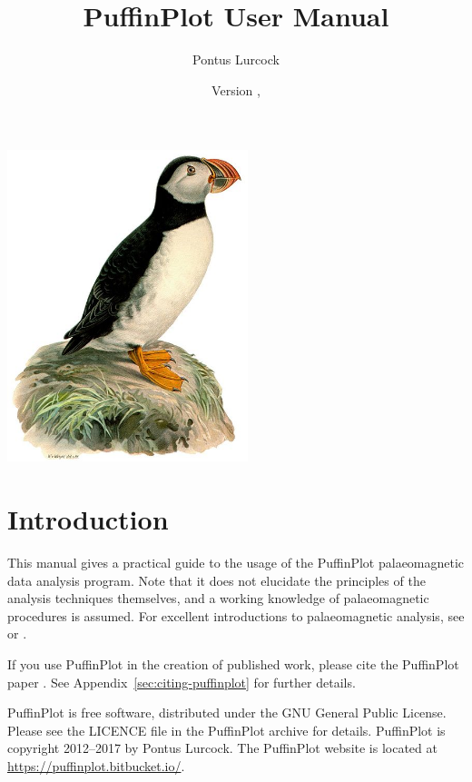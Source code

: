 \documentclass[a4paper,british]{article}
\title{PuffinPlot User Manual}
\author{Pontus Lurcock}
\date{Version \VcsVersion, \VcsDate}
\newcommand{\ppcmd}[1]{\textsf{#1}} %
\begin{document}
\maketitle
\begin{center}
\includegraphics[width=70mm]{figures/Fratercula_arctica.jpeg}
\end{center}

\tableofcontents

\clearpage

\section{Introduction}

This manual gives a practical guide to the usage of the PuffinPlot
palaeomagnetic data analysis program. Note that it does not elucidate the
principles of the analysis techniques themselves, and a working knowledge of
palaeomagnetic procedures is assumed. For excellent introductions to
palaeomagnetic analysis, see \cite{tauxe2010paleomagnetism} or
\cite{butler1992paleomagnetism}.

If you use PuffinPlot in the creation of published work, please cite the
PuffinPlot paper \citep{lurcock2012puffinplot}. See
Appendix~\ref{sec:citing-puffinplot} for further details.

PuffinPlot is free software, distributed under the GNU General Public
License. Please see the \ppcmd{LICENCE} file in the PuffinPlot archive
for details. PuffinPlot is copyright 2012--2017 by Pontus Lurcock. The
PuffinPlot website is located at \url{https://puffinplot.bitbucket.io/}.
\end{document}
